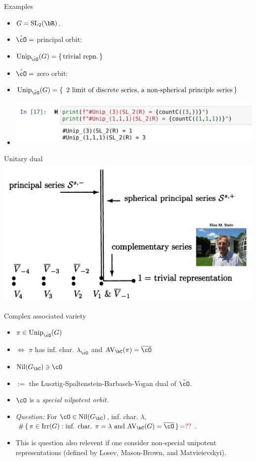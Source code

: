 \documentclass[t,mathserif,11pt,usenames,dvipsnames]{beamer}
\theoremstyle{plain}
\theoremstyle{definition}
\newcommand{\AV}{\mathrm{AV}}
\def\SL{{\mathrm{SL}}}
\def\Irr{{\mathrm{Irr}}}
\def\Unip{{\mathrm{Unip}}}
\def\ckcO{{\check{\cO}}}
\def\Nil{\mathrm{Nil}}
\def\blue{\color{blue}}
\let\oldemph\emph
\def\emph#1{\oldemph{\blue #1}}
\begin{document}
\begin{frame}{Examples}

  \begin{itemize}
    \item[] $G = \SL_{2}(\bR)$.\pause
    \item $\ckcO=$ principal orbit:
    \item[] $\Unip_{{\ckcO}}(G)=\set{\text{trivial repn.}}$
    \item $\ckcO=$ zero orbit:
    \item[] $\Unip_{{\ckcO}}(G)=\set{\text{ 2 limit of discrete series,
          a non-spherical principle series}}$
    \item \includegraphics[width=\textwidth]{SL2-unip}
  \end{itemize}
\end{frame}

\begin{frame}{Unitary dual}
     \includegraphics[width=\textwidth]{unitary_sl2}
\end{frame}

\begin{frame}{Complex associated variety}
  \begin{itemize}
    \item $\pi \in \Unip_{\ckcO}(G)$
    \item[] $\Longleftrightarrow$ $\pi$ has inf. char.
          $\lambda_{\ckcO}$ and $\AV_\bC(\pi) = \overline{\cO}$
          \item $\Nil(G_\bC)\ni \cO $
          \item[] $:=$ the Lusztig-Spaltenstein-Barbasch-Vogan dual of $\ckcO$.
    \item[] $\cO$ is a \emph{special nilpotent orbit.}
    \item \emph{Question: } For $\cO \in \Nil(G_{\bC})$, inf. char. $\lambda$,
    $\# \set{\pi \in \Irr(G) : \text{inf. char. $\pi=\lambda$ and
      } \AV_{\bC}(G) = \overline{\cO}} {\color{red}= ??}$.
    \item This is question also relevent if one consider non-special unipotent
    representations (defined by Losev, Mason-Brown, and Matvieievskyi).
  \end{itemize}
\end{frame}
\end{document}
